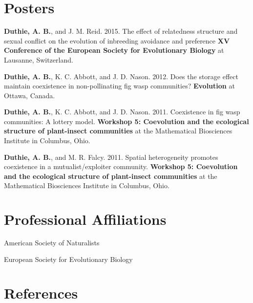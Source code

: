 \documentclass[letterpaper]{article}
\renewenvironment{itemize}{
  \begin{list}{}{
    \setlength{\leftmargin}{1.5em}
  }
}{
  \end{list}
}
\begin{document}
\section*{Posters}
\begin{itemize}
\item {\bf Duthie, A. B.}, and J. M. Reid. 2015. The effect of relatedness structure and sexual conflict on the evolution of inbreeding avoidance and preference {\bf XV Conference of the European Society for Evolutionary Biology} at Lausanne, Switzerland.
\item {\bf Duthie, A. B.}, K. C. Abbott, and J. D. Nason. 2012. Does the storage effect maintain coexistence in non-pollinating fig wasp communities? {\bf Evolution} at Ottawa, Canada.
\item {\bf Duthie, A. B.}, K. C. Abbott, and J. D. Nason. 2011. Coexistence in fig wasp communities: A lottery model. {\bf Workshop 5: Coevolution and the ecological structure of plant-insect communities} at the Mathematical Biosciences Institute in Columbus, Ohio.
\item {\bf Duthie, A. B.}, and M. R. Falcy. 2011. Spatial heterogeneity promotes coexistence in a mutualist/exploiter community. {\bf Workshop 5: Coevolution and the ecological structure of plant-insect communities} at the Mathematical Biosciences Institute in Columbus, Ohio.
\end{itemize}

\section*{Professional Affiliations}
\begin{itemize}
\item American Society of Naturalists%
\item European Society for Evolutionary Biology
\end{itemize}

\section*{References}
\end{document}

